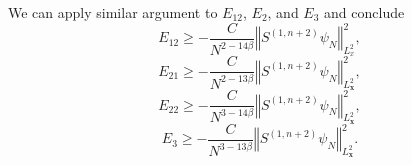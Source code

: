 \documentclass[12pt,letterpaper,leqno]{amsart}
\theoremstyle{plain}
\numberwithin{equation}{section}
\numberwithin{theorem}{section}
\numberwithin{proposition}{section}
\numberwithin{lemma}{section}
\numberwithin{corollary}{section}
\begin{document}
We can apply similar argument to $E_{12}$, $E_{2}$, and $E_{3}$ and conclude%
\begin{equation}
E_{12}\geqslant -\frac{C}{N^{2-14\beta }}\left\Vert S^{(1,n+2)}\psi
_{N}\right\Vert _{L_{x}^{2}}^{2},  \label{energy estimate:E12}
\end{equation}%
\begin{equation}
E_{21}\geqslant -\frac{C}{N^{2-13\beta }}\left\Vert S^{(1,n+2)}\psi
_{N}\right\Vert _{L_{\mathbf{x}}^{2}}^{2},  \label{energy estimate:E21}
\end{equation}%
\begin{equation}
E_{22}\geqslant -\frac{C}{N^{3-14\beta }}\left\Vert S^{(1,n+2)}\psi
_{N}\right\Vert _{L_{\mathbf{x}}^{2}}^{2},  \label{energy estimate:E22}
\end{equation}%
\begin{equation}
E_{3}\geqslant -\frac{C}{N^{3-13\beta }}\left\Vert S^{(1,n+2)}\psi
_{N}\right\Vert _{L_{\mathbf{x}}^{2}}^{2}.  \label{energy estimate:E3}
\end{equation}
\end{document}

